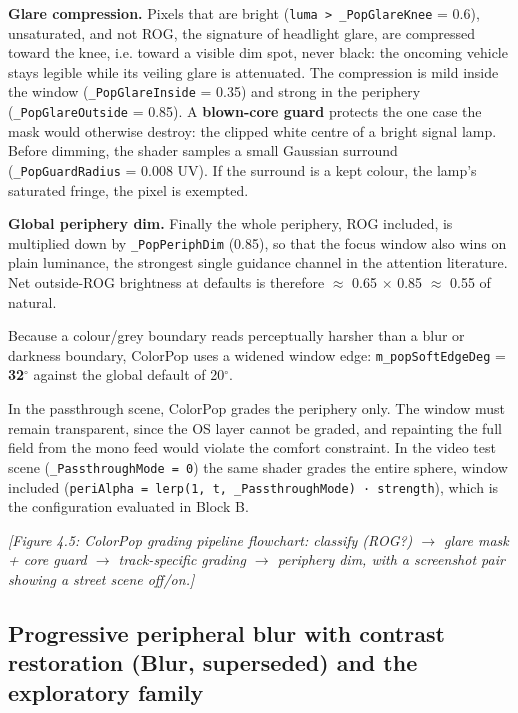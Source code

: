 \textbf{Glare compression.} Pixels that are bright (\verb|luma > _PopGlareKnee| = 0.6), unsaturated, and not
ROG, the signature of headlight glare, are compressed toward the knee, i.e. toward a visible dim
spot, never black: the oncoming vehicle stays legible while its veiling glare is attenuated. The
compression is mild inside the window (\verb|_PopGlareInside| = 0.35) and strong in the periphery
(\verb|_PopGlareOutside| = 0.85). A \textbf{blown-core guard} protects the one case the mask would otherwise
destroy: the clipped white centre of a bright signal lamp. Before dimming, the shader samples a small
Gaussian surround (\verb|_PopGuardRadius| = 0.008 UV). If the surround is a kept colour, the lamp's
saturated fringe, the pixel is exempted.

\textbf{Global periphery dim.} Finally the whole periphery, ROG included, is multiplied down by
\verb|_PopPeriphDim| (0.85), so that the focus window also wins on plain luminance, the strongest single
guidance channel in the attention literature. Net outside-ROG brightness at defaults is therefore
$\approx$ 0.65 $\times$ 0.85 $\approx$ 0.55 of natural.

Because a colour/grey boundary reads perceptually harsher than a blur or darkness boundary, ColorPop
uses a widened window edge: \verb|m_popSoftEdgeDeg| = \textbf{32$^{\circ}$} against the global default of 20$^{\circ}$.

In the passthrough scene, ColorPop grades the periphery only. The window must remain transparent,
since the OS layer cannot be graded, and repainting the full field from the mono feed would violate
the comfort constraint. In the video test scene (\verb|_PassthroughMode = 0|) the same shader grades the
entire sphere, window included (\verb|periAlpha = lerp(1, t, _PassthroughMode) · strength|), which is the
configuration evaluated in Block B.

\textit{[Figure 4.5: ColorPop grading pipeline flowchart: classify (ROG?) $\rightarrow$ glare mask + core guard $\rightarrow$
track-specific grading $\rightarrow$ periphery dim, with a screenshot pair showing a street scene off/on.]}

\subsection{Progressive peripheral blur with contrast restoration (Blur, superseded) and the exploratory family}

